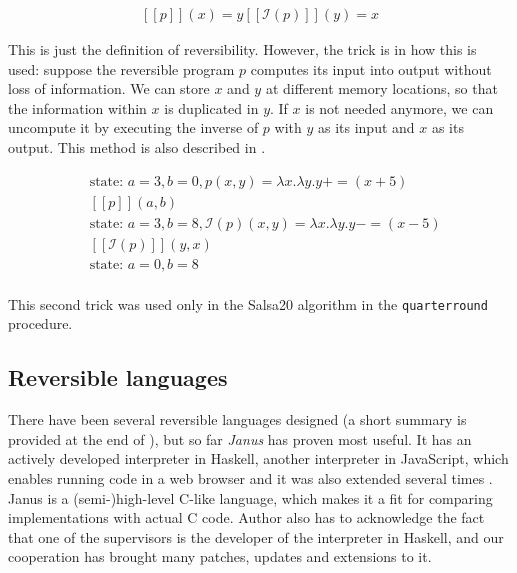 \documentclass[a4paper,10pt,openright]{memoir}
\newcommand{\inv}[1]{\ensuremath{\mathcal{I}(#1)}}
\newcommand{\exe}[1]{\ensuremath{[\![#1]\!]}}
\newcommand{\term}[1]{\textit{#1}}
\newcommand{\code}[1]{\texttt{#1}}
\begin{document}
\begin{align*}
\exe{p}(x) = y
\exe{\inv{p}}(y) = x
\end{align*}

This is just the definition of reversibility. However, the trick is in 
how this is used: suppose the reversible program $p$ computes its input 
into output without loss of information. We can store $x$ and $y$ at 
different memory locations, so that the information within $x$ is 
duplicated in $y$. If $x$ is not needed anymore, we can uncompute it by 
executing the inverse of $p$ with $y$ as its input and $x$ as its 
output. This method is also described in \cite{Bennett73}.

\begin{align*}
&\text{state: } a = 3, b = 0, p(x,y) = \lambda x. \lambda y. y += (x + 5)\\
&\exe{p}(a,b)\\
&\text{state: } a = 3, b = 8, \inv{p}(x,y) = \lambda x. \lambda y. y -= (x - 5)\\
&\exe{\inv{p}}(y,x)\\
&\text{state: } a = 0, b = 8\\
\end{align*}


This second trick was used only in the Salsa20 algorithm in the 
\code{quarterround} procedure. 

\subsection{Reversible languages}

There have been several reversible languages designed (a short summary 
is provided at the end of \cite{Yokoyama2010}), but so far \term{Janus} 
has proven most useful. It has an actively developed interpreter in 
Haskell, another interpreter in JavaScript, which enables running code 
in a web browser and it was also extended several times 
\cite{janus-topps}. Janus is a (semi-)high-level C-like language, which 
makes it a fit for comparing implementations with actual C code. Author 
also has to acknowledge the fact that one of the supervisors is the 
developer of the interpreter in Haskell, and our cooperation has 
brought many patches, updates and extensions to it.
\end{document}
